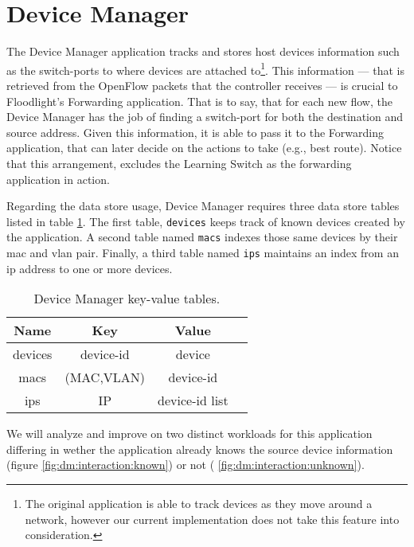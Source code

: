 \section{Device Manager}
\label{sec:feasibility:dm}
\glsresetall

The Device Manager application tracks and stores host devices
information such as the switch-ports to where devices are
attached to\footnote{The original application is able to track devices as
  they move around a network, however our current implementation does
  not take this feature into consideration.}. This information ---
that is retrieved from the OpenFlow packets that the controller receives --- is crucial to
Floodlight’s Forwarding application. That is to say, that for  each new flow, the Device
Manager has the job of finding a switch-port for both the destination
and source address. Given this information, it is able to pass it to
the Forwarding application, that can later decide on the actions to
take (e.g., best route). Notice that this arrangement, excludes the
Learning Switch as the  forwarding application in action. 

Regarding the data store usage, Device Manager requires three
data store tables listed in table \ref{table:dm:indexes}.  The first
table, \texttt{devices} keeps track of known devices created by the
application. A second table named \texttt{macs}  indexes those same devices by their
\gls{mac} and \gls{vlan}  pair.  Finally, a third table named
\texttt{ips} maintains an index from an \gls{ip} address to one or
more devices.

\begin{table}
\small
\begin{tabular}{cccc}
Name & Key & Value & \\ \toprule
devices & device-id &  device \\\midrule
macs & (MAC,VLAN)  & device-id   \\\midrule
ips  & IP & device-id list \\\midrule
\end{tabular}
\caption[Device Manager key-value tables]{Device Manager key-value tables.}
\label{table:dm:indexes}
\end{table}

We will analyze and improve on  two distinct workloads for this application differing in
wether the application already knows the source device information (figure \ref{fig:dm:interaction:known})
or not ( \ref{fig:dm:interaction:unknown}). 

